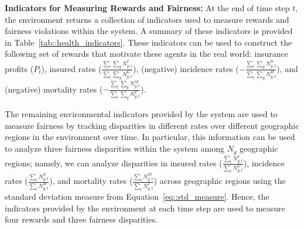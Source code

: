 \begin{table}[t]
\caption{Healthcare MAFE Component Indicators}
\label{tab::health_indicators}
\centering
{}
\end{table}

\textbf{Indicators for Measuring Rewards and Fairness:} 
At the end of time step $t$, the environment returns a collection of indicators used to measure rewards and fairness violations within the system. A summary of these indicators is provided in Table~\ref{tab::health_indicators}. These indicators can be used to construct the following set of rewards that motivate these agents in the real world: insurance profits ($P_{t}$), insured rates ($\frac{\sum_t \sum_g N_{g,t}^{I}}{\sum_t \sum_g N_{g,t}^{G}}$), (negative) incidence rates ($-\frac{\sum_t \sum_g N_{g,t}^{S}}{\sum_t \sum_g N_{g,t}^{H}}$), and (negative) mortality rates ($-\frac{\sum_t \sum_g N_{g,t}^{M}}{\sum_t \sum_g N_{g,t}^{T}}$). 

The remaining environmental indicators provided by the system are used to measure fairness by tracking disparities in different rates over different geographic regions in the environment over time. In particular, this information can be used to analyze three fairness disparities within the system among $N_g$ geographic regions; namely, we can analyze disparities in insured rates ($\frac{\sum_t N_{g,t}^{I}}{\sum_t N_{g,t}^{G}}$), incidence rates ($\frac{\sum_tN_{g,t}^{S}}{\sum_t N_{g,t}^{H}}$), and mortality rates ($\frac{\sum_tN_{g,t}^{M}}{\sum_t N_{g,t}^{T}}$) across geographic regions using the standard deviation measure from Equation~\ref{eq::std_measure}. Hence, the indicators provided by the environment at each time step are used to measure four rewards and three fairness disparities.

